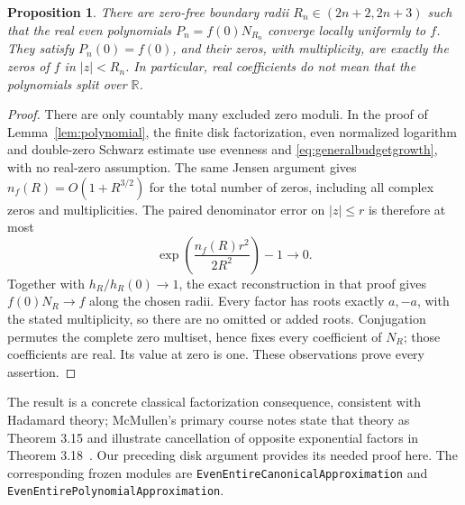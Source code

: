 \documentclass[11pt]{article}
\newtheorem{proposition}[theorem]{Proposition}
\theoremstyle{remark}\newtheorem{remark}[theorem]{Remark}
\newcommand{\R}{\mathbb R}\newcommand{\C}{\mathbb C}
\newcommand{\code}[1]{{\small\nolinkurl{#1}}}
\begin{document}
\begin{proposition}\label{prop:generaldivisor}
There are zero-free boundary radii $R_n\in(2n+2,2n+3)$ such that the
real even polynomials $P_n=f(0)N_{R_n}$ converge locally uniformly to $f$.
They satisfy $P_n(0)=f(0)$, and their zeros, with multiplicity, are exactly
the zeros of $f$ in $|z|<R_n$. In particular, real coefficients do not
mean that the polynomials split over $\R$.
\end{proposition}
\begin{proof}
There are only countably many excluded zero moduli. In the proof of
Lemma~\ref{lem:polynomial}, the finite disk factorization, even normalized
logarithm and double-zero Schwarz estimate use evenness and
\eqref{eq:generalbudgetgrowth}, with no real-zero assumption. The same
Jensen argument gives $n_f(R)=O(1+R^{3/2})$ for the total number of zeros,
including all complex zeros and multiplicities. The paired denominator
error on $|z|\leq r$ is therefore at most
\[
 \exp\!\left(\frac{n_f(R)r^2}{2R^2}\right)-1\longrightarrow0.
\]
Together with $h_R/h_R(0)\to1$, the exact reconstruction in that proof gives
$f(0)N_R\to f$ along the chosen radii. Every factor has roots exactly
$a,-a$, with the stated multiplicity, so there are no omitted or added
roots. Conjugation permutes the complete zero multiset, hence fixes every
coefficient of $N_R$; those coefficients are real. Its value at zero is
one. These observations prove every assertion.
\end{proof}
The result is a concrete classical factorization consequence, consistent
with Hadamard theory; McMullen's primary course notes state that theory
as Theorem 3.15 and illustrate cancellation of opposite exponential
factors in Theorem 3.18~\cite{mcmullen}. Our preceding disk argument
provides its needed proof here. The corresponding frozen modules are
\code{EvenEntireCanonicalApproximation} and
\code{EvenEntirePolynomialApproximation}.
\end{document}
